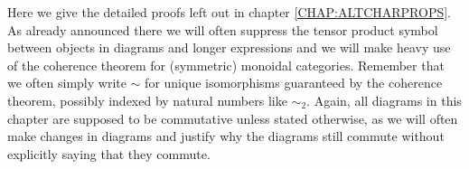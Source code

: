 Here we give the detailed proofs left out in chapter \ref{CHAP:ALTCHARPROPS}. As already announced there we will often suppress the tensor product symbol between objects in diagrams and longer expressions and we will make heavy use of the coherence theorem for (symmetric) monoidal categories. Remember that we often simply write $\sim$ for unique isomorphisms guaranteed by the coherence theorem, possibly indexed by natural numbers like $\sim_{2}$. Again, all diagrams in this chapter are supposed to be commutative unless stated otherwise, as we will often make changes in diagrams and justify why the diagrams still commute without explicitly saying that they commute.
